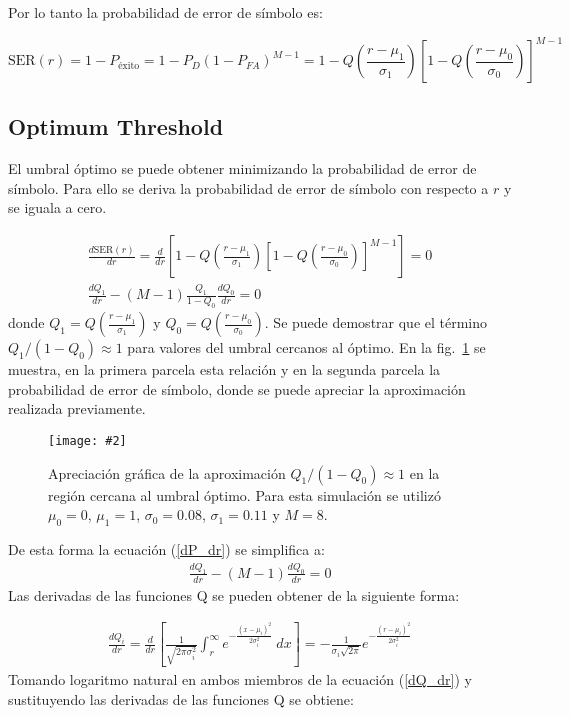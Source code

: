 \documentclass{article}
\newcommand{\fig}[3][1.0]{
    \begin{figure}[!ht]
        \centering
        \texttt{[image: \#2]}
        \caption{#3}
        \label{fig:#2}
    \end{figure}
}
\begin{document}
    Por lo tanto la probabilidad de error de símbolo es:
    \begin{tcolorbox}[colback=yellow!20!white,colframe=black]
        \begin{equation}
            \text{SER}(r) = 1-P_\text{éxito} = 1-P_{D}(1-P_{FA})^{M-1}=1-Q\left(\frac{r-\mu_1}{\sigma_1}\right)\left[1-Q\left(\frac{r-\mu_0}{\sigma_0}\right)\right]^{M-1}
        \end{equation}
    \end{tcolorbox}

    \subsection{Optimum Threshold}
        El umbral óptimo se puede obtener minimizando la probabilidad de error de símbolo. Para ello se deriva la probabilidad de error de símbolo con respecto a $r$ y se iguala a cero.
        
        \begin{align}
            \frac{d \text{SER}(r)}{dr} = \frac{d}{dr}\left[1-Q\left(\frac{r-\mu_1}{\sigma_1}\right)\left[1-Q\left(\frac{r-\mu_0}{\sigma_0}\right)\right]^{M-1}\right] = 0 \nonumber\\
            \frac{dQ_1}{dr}-(M-1)\frac{Q_1}{1-Q_0}\frac{dQ_0}{dr} = 0
            \label{dP_dr}
        \end{align}
        donde $Q_1 = Q\left(\frac{r-\mu_1}{\sigma_1}\right)$ y $Q_0 = Q\left(\frac{r-\mu_0}{\sigma_0}\right)$. Se puede demostrar que el término $Q_1/(1-Q_0)\approx 1$ para valores del umbral cercanos al óptimo. En la fig.~\ref{fig:SER} se muestra, en la primera parcela esta relación y en la segunda parcela la probabilidad de error de símbolo, donde se puede apreciar la aproximación realizada previamente.
        
        \fig{SER}{Apreciación gráfica de la aproximación $Q_1/(1-Q_0)\approx 1$ en la región cercana al umbral óptimo. Para esta simulación se utilizó $\mu_0=0$, $\mu_1=1$, $\sigma_0=0.08$, $\sigma_1=0.11$ y $M=8$.}

        De esta forma la ecuación (\ref{dP_dr}) se simplifica a:
        \begin{align}
            \frac{dQ_1}{dr}-(M-1)\frac{dQ_0}{dr} = 0 \label{dQ_dr}
        \end{align}
        Las derivadas de las funciones Q se pueden obtener de la siguiente forma:
        
        \begin{align}
            \frac{dQ_i}{dr} = \frac{d}{dr}\left[\frac{1}{\sqrt{2\pi\sigma_i^2}}\int_{r}^{\infty} e^{-\frac{(x-\mu_i)^2}{2\sigma_i^2}}\:dx\right] = -\frac{1}{\sigma_i\sqrt{2\pi}}e^{-\frac{(r-\mu_i)^2}{2\sigma_i^2}}
        \end{align}
        Tomando logaritmo natural en ambos miembros de la ecuación (\ref{dQ_dr}) y sustituyendo
        las derivadas de las funciones Q se obtiene:
        
\end{document}
